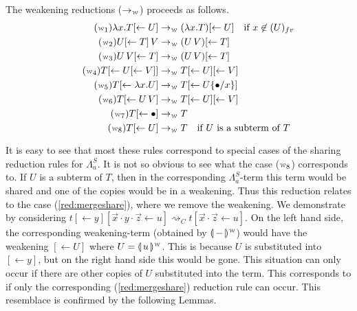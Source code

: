 \documentclass[a4paper,UKenglish,cleveref, autoref]{lipics-v2019}
\newcommand{\FALC}{\Lambda^{S}_{a}}
\newcommand{\fv}[1]{(#1)_{fv}}
\newcommand{\abs}[2]{\lambda #1 . #2}
\newcommand{\app}[2]{#1 \, #2}
\newcommand{\share}[3]{#1 [#2 \leftarrow #3]}
\newcommand{\sub}[3]{#1 \{ #2 / #3 \}}
\newcommand{\weaksymbol}{\mbox{\tiny $\mathcal{W}$}}
\newcommand{\compweak}[1]{\llparenthesis \, #1 \, \rrparenthesis^{\weaksymbol}}
\begin{document}
\begin{definition}
The weakening reductions ($\rightarrow_{\weaksymbol}$) proceeds as follows.
\begingroup
\allowdisplaybreaks
\begin{align*}
	\tag{$\weaksymbol_{1}$}
	\abs{x}{\share{T}{}{U}} &\rightarrow_{\weaksymbol} (\abs{x}{T})\share{}{}{U} \quad \text{if } x \not\in \fv{U} \\
	\tag{$\weaksymbol_{2}$}
	\app{\share{U}{}{T}}{V} &\rightarrow_{\weaksymbol} (\app{U}{V}) \share{}{}{T} \\
	\tag{$\weaksymbol_{3}$}
	\app{U}{\share{V}{}{T}} &\rightarrow_{\weaksymbol} (\app{U}{V}) \share{}{}{T} \\
	\tag{$\weaksymbol_{4}$}
	\share{T}{}{\share{U}{}{V}} &\rightarrow_{\weaksymbol} \share{T}{}{U} \share{}{}{V} \\
	\tag{$\weaksymbol_{5}$}
	\share{T}{}{\abs{x}{U}} &\rightarrow_{\weaksymbol} \share{T}{}{U \sub{}{\bullet}{x}} \\
	\tag{$\weaksymbol_{6}$}
	\share{T}{}{\app{U}{V}} &\rightarrow_{\weaksymbol} T \share{}{}{U} \share{}{}{V} \\
	\tag{$\weaksymbol_{7}$}
	\share{T}{}{\bullet} &\rightarrow_{\weaksymbol} T \\
	\tag{$\weaksymbol_{8}$}
	\share{T}{}{U} &\rightarrow_{\weaksymbol} T \quad \text{if $U$ is a subterm of $T$}
\end{align*}
\endgroup
\end{definition}
\noindent It is easy to see that most these rules correspond to special cases of the sharing reduction rules for $\FALC$. It is not so obvious to see what the case ($\weaksymbol_{8}$) corresponds to. If $U$ is a subterm of $T$, then in the corresponding $\FALC$-term this term would be shared and one of the copies would be in a weakening. Thus this reduction relates to the case (\ref{red:mergeshare}), where we remove the weakening. We demonstrate by considering $t \share{}{}{y} \share{}{\vec{x} \cdot y \cdot \vec{z}}{u}  \rightsquigarrow_{C} t \share{}{\vec{x} \cdot \vec{z}}{u}$. On the left hand side, the corresponding weakening-term (obtained by $\compweak{-}$) would have the weakening $\share{}{}{U}$ where $U = \compweak{u}$. This is because $U$ is substituted into $\share{}{}{y}$, but on the right hand side this would be gone. This situation can only occur if there are other copies of $U$ substituted into the term. This corresponds to if only the corresponding (\ref{red:mergeshare}) reduction rule can occur. This resemblace is confirmed by the following Lemmas.
\end{document}

